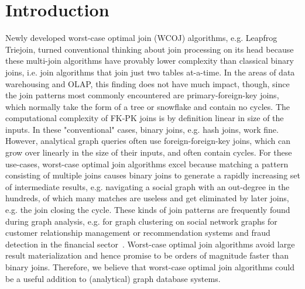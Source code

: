 \section{Introduction} \label{sec:introduction}

Newly developed worst-case optimal join (WCOJ) algorithms, e.g. Leapfrog Triejoin, turned conventional thinking about join processing on its head because these multi-join algorithms have provably lower complexity than classical binary joins, i.e. join algorithms that join just two tables at-a-time.
In the areas of data warehousing and OLAP, this finding does not have much impact, though, since the join patterns most commonly encountered are primary-foreign-key joins, which normally take the form of a tree or snowflake and contain no cycles.
The computational complexity of FK-PK joins is by definition linear in size of the inputs.
In these "conventional" cases, binary joins, e.g. hash joins, work fine.
However, analytical graph queries often use foreign-foreign-key joins, which can grow over linearly in the size of their inputs, and often contain cycles.
For these use-cases, worst-case optimal join algorithms excel because matching a pattern consisting of multiple joins causes binary joins to generate a rapidly increasing set of intermediate results, e.g. navigating a social graph with an out-degree in the hundreds, of which many matches are useless and get eliminated by later joins, e.g. the join closing the cycle. 
These kinds of join patterns are frequently found during graph analysis, e.g. for graph clustering on social network graphs for customer relationship management or recommendation systems and fraud detection in the financial sector~\cite{gcore,gupta2014real}.
Worst-case optimal join algorithms avoid large result materialization and hence promise to be orders of magnitude faster than binary joins.
Therefore, we believe that worst-case optimal join algorithms could be a useful addition to (analytical) graph database systems.

